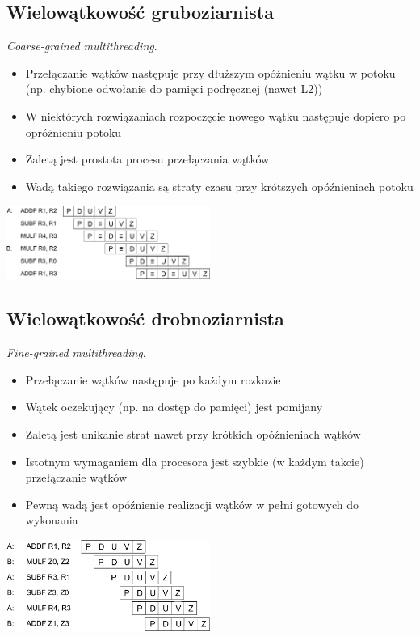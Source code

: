 \documentclass[a4paper,twoside]{article}
\begin{document}
\subsection{Wielowątkowość gruboziarnista}
\emph{Coarse-grained multithreading}.
\begin{itemize}
	\item Przełączanie wątków następuje przy dłuższym opóźnieniu wątku w potoku (np. chybione odwołanie do pamięci podręcznej (nawet L2))
	\item W niektórych rozwiązaniach rozpoczęcie nowego wątku następuje dopiero po opróżnieniu potoku
	\item Zaletą jest prostota procesu przełączania wątków
	\item Wadą takiego rozwiązania są straty czasu przy krótszych opóźnieniach potoku
\end{itemize}
\begin{center}
	\vspace{0.3cm}
	\includegraphics[width=0.5\textwidth]{./images/wielowatkowosc01}
\end{center}
\subsection{Wielowątkowość drobnoziarnista}
\emph{Fine-grained multithreading}.
\begin{itemize}
	\item Przełączanie wątków następuje po każdym rozkazie
	\item Wątek oczekujący (np. na dostęp do pamięci) jest pomijany
	\item Zaletą jest unikanie strat nawet przy krótkich opóźnieniach wątków
	\item Istotnym wymaganiem dla procesora jest szybkie (w każdym takcie) przełączanie wątków
	\item Pewną wadą jest opóźnienie realizacji wątków w pełni gotowych do wykonania
\end{itemize}
\begin{center}
	\vspace{0.3cm}
	\includegraphics[width=0.5\textwidth]{./images/wielowatkowosc02}
\end{center}
\end{document}
